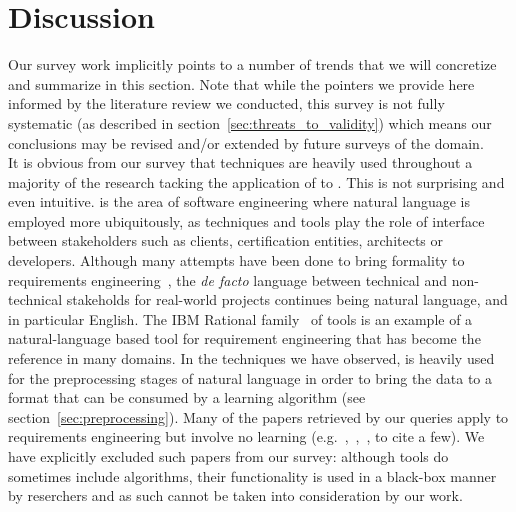 \section{Discussion}
\label{sec:discussion}

Our survey work implicitly points to a number of trends that we will
concretize and summarize in this section. Note that while the pointers we
provide here informed by the literature review we conducted, this survey is not
fully systematic (as described in section~\ref{sec:threats_to_validity}) which
means our conclusions may be revised and/or extended by future surveys of the
domain.\\

It is obvious from our survey that \NLP techniques are heavily used
throughout a majority of the research tacking the application of \ML to
\RE. This is not surprising and even intuitive. \RE is the area of software
engineering where natural language is employed more ubiquitously, as \RE
techniques and tools play the role of interface between stakeholders such as
clients, certification entities, architects or developers. Although many
attempts have been done to bring formality to requirements
engineering~\cite{Teufl17,LucioRCA16}, the \emph{de facto} language between
technical and non-technical stakeholds for real-world projects continues being natural language, and in particular English.
The IBM Rational \DOORS family~\cite{doors} of tools is an example
of a natural-language based tool for requirement engineering that has become the
reference in many domains. In the techniques we have observed, \NLP is heavily
used for the preprocessing stages of natural language in order to bring the data to a format
that can be consumed by a learning algorithm (see
section~\ref{sec:preprocessing}). Many of the papers retrieved by our queries apply \NLP to requirements
engineering but involve no learning (e.g.~\cite{Xiao:2012},~\cite{Deeptimahanti:2011},~\cite{ChengHeLiangLi:2010}, to
cite a few). We have explicitly excluded such papers from our survey: although
\NLP tools do sometimes include \ML algorithms, their functionality is used in a black-box
manner by \RE reserchers and as such cannot be taken into consideration by our
work.\\
 
